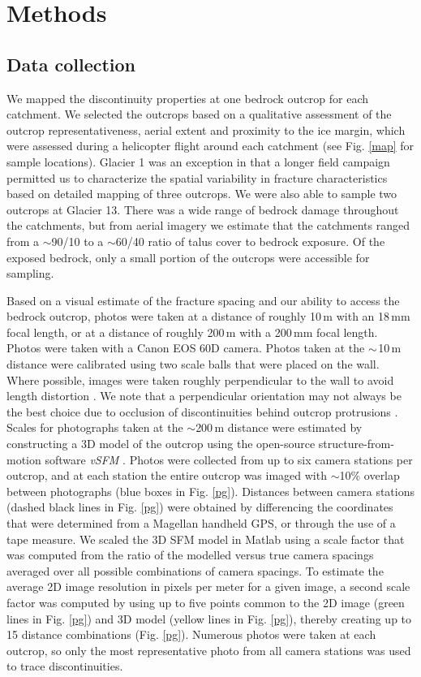 \documentclass[draft,linenumbers]{agujournal}
\begin{document}
\section{Methods}

\subsection{Data collection}

We mapped the discontinuity properties at one bedrock outcrop for each catchment. We selected the outcrops based on a qualitative assessment of the outcrop representativeness, aerial extent and proximity to the ice margin, which were assessed during a helicopter flight around each catchment (see Fig. \ref{map} for sample locations). Glacier 1 was an exception in that a longer field campaign permitted us to characterize the spatial variability in fracture characteristics based on detailed mapping of three outcrops. We were also able to sample two outcrops at Glacier 13. There was a wide range of bedrock damage throughout the catchments, but from aerial imagery we estimate that the catchments ranged from a $\sim$90/10 to a $\sim$60/40 ratio of talus cover to bedrock exposure. Of the exposed bedrock, only a small portion of the outcrops were accessible for sampling. 

Based on a visual estimate of the fracture spacing and our ability to access the bedrock outcrop, photos were taken at a distance of roughly 10\,m with an 18\,mm focal length, or at a distance of roughly 200\,m with a 200\,mm focal length. Photos were taken with a Canon EOS 60D camera. Photos taken at the $\rm \sim$10\,m distance were calibrated using two scale balls that were placed on the wall. Where possible, images were taken roughly perpendicular to the wall to avoid length distortion \citep{Priest2012}. We note that a perpendicular orientation may not always be the best choice due to occlusion of discontinuities behind outcrop protrusions \citep[e.g.][]{Sturzenegger2009}. Scales for photographs taken at the $\sim$200\,m distance were estimated by constructing a 3D model of the outcrop using the open-source structure-from-motion software \emph{vSFM} \citep{Wu2011}. Photos were collected from up to six camera stations per outcrop, and at each station the entire outcrop was imaged with $\sim$10\% overlap between photographs (blue boxes in Fig. \ref{pg}). Distances between camera stations (dashed black lines in Fig. \ref{pg}) were obtained by differencing the coordinates that were determined from a Magellan handheld GPS, or through the use of a tape measure. We scaled the 3D SFM model in Matlab using a scale factor that was computed from the ratio of the modelled versus true camera spacings averaged over all possible combinations of camera spacings. To estimate the average 2D image resolution in pixels per meter for a given image, a second scale factor was computed by using up to five points common to the 2D image (green lines in Fig. \ref{pg}) and 3D model (yellow lines in Fig. \ref{pg}), thereby creating up to 15 distance combinations (Fig. \ref{pg}). Numerous photos were taken at each outcrop, so only the most representative photo from all camera stations was used to trace discontinuities.
\end{document}
